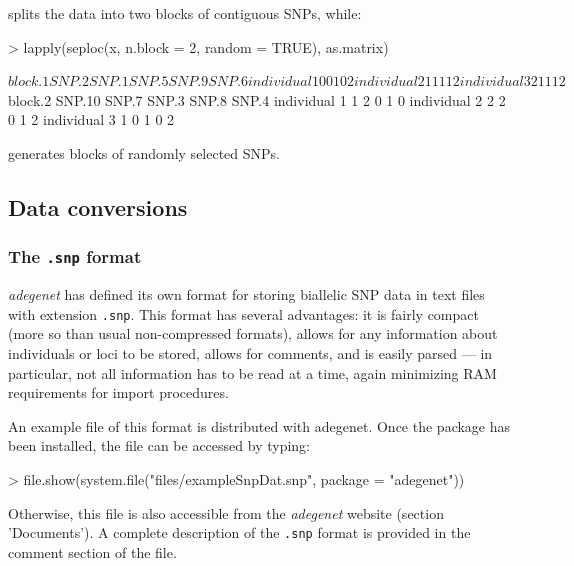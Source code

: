 \documentclass{article}
\begin{document}
splits the data into two blocks of contiguous SNPs, while:
\begin{Schunk}
\begin{Sinput}
> lapply(seploc(x, n.block = 2, random = TRUE), as.matrix)
\end{Sinput}
\begin{Soutput}
$block.1
             SNP.2 SNP.1 SNP.5 SNP.9 SNP.6
individual 1     0     0     1     0     2
individual 2     1     1     1     1     2
individual 3     2     1     1     1     2

$block.2
             SNP.10 SNP.7 SNP.3 SNP.8 SNP.4
individual 1      1     2     0     1     0
individual 2      2     2     0     1     2
individual 3      1     0     1     0     2
\end{Soutput}
\end{Schunk}
generates blocks of randomly selected SNPs.




\subsection{Data conversions}

\subsubsection{The \texttt{.snp} format}

\textit{adegenet} has defined its own format for storing biallelic SNP data in text files with
extension \texttt{.snp}.
This format has several advantages: it is fairly compact (more so than usual non-compressed
formats), allows for any information about individuals or loci to be stored, allows for comments,
and is easily parsed --- in particular, not all information has to be read at a time, again
minimizing RAM requirements for import procedures.


An example file of this format is distributed with adegenet.
Once the package has been installed, the file can be accessed by typing:
\begin{Schunk}
\begin{Sinput}
> file.show(system.file("files/exampleSnpDat.snp", package = "adegenet"))
\end{Sinput}
\end{Schunk}
Otherwise, this file is also accessible from the \textit{adegenet} website (section 'Documents').
A complete description of the \texttt{.snp} format is provided in the comment section of the file.
\\
\end{document}
